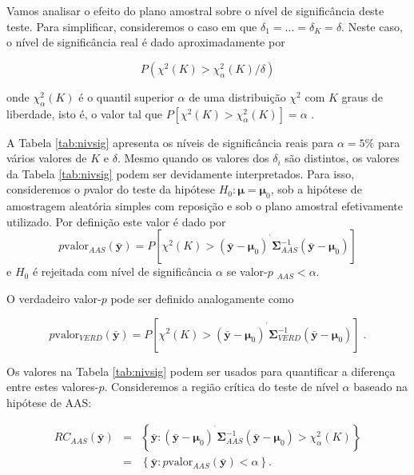 \documentclass[]{book}
\theoremstyle{definition}
\theoremstyle{definition}
\theoremstyle{definition}
\theoremstyle{remark}
\begin{document}
Vamos analisar o efeito do plano amostral sobre o nível de significância
deste teste. Para simplificar, consideremos o caso em que
\(\delta _{1}=\ldots =\delta _{K}=\delta\). Neste caso, o nível de
significância real é dado aproximadamente por

\begin{equation}
P\left(\chi ^{2}\left( K\right) >\chi _{\alpha }^{2}\left( K\right) /\delta\right)  \label{eq:epa12}
\end{equation}

onde \(\chi _{\alpha }^{2}\left( K\right)\) é o quantil superior
\(\alpha\) de uma distribuição \(\chi ^{2}\) com \(K\) graus de
liberdade, isto é, o valor tal que
\(P\left[ \chi ^{2}\left( K\right) >\chi _{\alpha}^{2}\left( K\right) \right] =\alpha\)
.

A Tabela \ref{tab:nivsig} apresenta os níveis de significância reais
para \(\alpha =5\%\) para vários valores de \(K\) e \(\delta\). Mesmo
quando os valores dos \(\delta _{i}\) são distintos, os valores da
Tabela \ref{tab:nivsig} podem ser devidamente interpretados. Para isso,
consideremos o \(p\)valor do teste da hipótese
\(H_{0}:\mathbf{\mu }=\mathbf{\mu }_{0}\), sob a hipótese de amostragem
aleatória simples com reposição e sob o plano amostral efetivamente
utilizado. Por definição este valor é dado por \[
p\mbox{valor}_{AAS}\left( \mathbf{\bar{y}}\right) =P\left[ \chi ^{2}\left(
K\right) >\left( \mathbf{\bar{y}-\mu }_{0}\right) ^{^{\prime }}\mathbf{
\Sigma }_{AAS}^{-1}\left( \mathbf{\bar{y}-\mu }_{0}\right) \right] 
\] e \(H_{0}\) é rejeitada com nível de significância \(\alpha\) se
valor-\(p\) \(_{AAS}<\alpha\).

O verdadeiro valor-\(p\) pode ser definido analogamente como

\begin{equation}
p\mbox{valor}_{VERD}\left( \mathbf{\bar{y}}\right) =P\left[ \chi ^{2}\left(K\right) >\left( \mathbf{\bar{y}-\mu }_{0}\right) ^{^{\prime }}\mathbf{\Sigma }_{VERD}^{-1}\left( \mathbf{\bar{y}-\mu }_{0}\right) \right] \;.
\label{eq:epa13}
\end{equation}

Os valores na Tabela \ref{tab:nivsig} podem ser usados para quantificar
a diferença entre estes valores-\(p\). Consideremos a região crítica do
teste de nível \(\alpha\) baseado na hipótese de AAS:

\begin{eqnarray}
RC_{AAS}\left( \mathbf{\bar{y}}\right) &=&\left\{ \mathbf{\bar{y}:}\left( 
\mathbf{\bar{y}-\mu }_{0}\right) ^{^{\prime }}\mathbf{\Sigma }
_{AAS}^{-1}\left( \mathbf{\bar{y}-\mu }_{0}\right) >\chi _{\alpha
}^{2}\left( K\right) \right\} \label{eq:epa14}  \\
&=&\left\{ \mathbf{\bar{y}:}p\mbox{valor}_{AAS}\left( \mathbf{\bar{y}}
\right) <\alpha \right\}.  \nonumber
\end{eqnarray}
\end{document}
